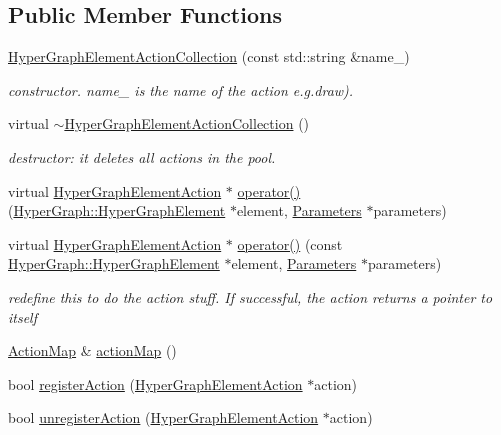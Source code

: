 \subsection*{Public Member Functions}
\begin{DoxyCompactItemize}
\item 
\hyperlink{classg2o_1_1HyperGraphElementActionCollection_a6af1ca2dfcdc0894eb594c68135dd614}{Hyper\+Graph\+Element\+Action\+Collection} (const std\+::string \&name\+\_\+)
\begin{DoxyCompactList}\small\item\em constructor. name\+\_\+ is the name of the action e.\+g.\+draw). \end{DoxyCompactList}\item 
virtual \hyperlink{classg2o_1_1HyperGraphElementActionCollection_ad55fc899922f91c1446d9d69f343c7ab}{$\sim$\+Hyper\+Graph\+Element\+Action\+Collection} ()
\begin{DoxyCompactList}\small\item\em destructor\+: it deletes all actions in the pool. \end{DoxyCompactList}\item 
virtual \hyperlink{classg2o_1_1HyperGraphElementAction}{Hyper\+Graph\+Element\+Action} $\ast$ \hyperlink{classg2o_1_1HyperGraphElementActionCollection_a1388f0d6629501c1b80035f80c56efbe}{operator()} (\hyperlink{structg2o_1_1HyperGraph_1_1HyperGraphElement}{Hyper\+Graph\+::\+Hyper\+Graph\+Element} $\ast$element, \hyperlink{structg2o_1_1HyperGraphElementAction_1_1Parameters}{Parameters} $\ast$parameters)
\item 
virtual \hyperlink{classg2o_1_1HyperGraphElementAction}{Hyper\+Graph\+Element\+Action} $\ast$ \hyperlink{classg2o_1_1HyperGraphElementActionCollection_a4cb9b20a8b1aac8eb018ef6fc4ec0dfc}{operator()} (const \hyperlink{structg2o_1_1HyperGraph_1_1HyperGraphElement}{Hyper\+Graph\+::\+Hyper\+Graph\+Element} $\ast$element, \hyperlink{structg2o_1_1HyperGraphElementAction_1_1Parameters}{Parameters} $\ast$parameters)
\begin{DoxyCompactList}\small\item\em redefine this to do the action stuff. If successful, the action returns a pointer to itself \end{DoxyCompactList}\item 
\hyperlink{classg2o_1_1HyperGraphElementAction_abc889fc90ae1bbb63d90c7993777417a}{Action\+Map} \& \hyperlink{classg2o_1_1HyperGraphElementActionCollection_a26d57ddd0079ed7181fbb322c9a8106c}{action\+Map} ()
\item 
bool \hyperlink{classg2o_1_1HyperGraphElementActionCollection_a9eb641e9c9bb22f3540dc98c2c750ea9}{register\+Action} (\hyperlink{classg2o_1_1HyperGraphElementAction}{Hyper\+Graph\+Element\+Action} $\ast$action)
\item 
bool \hyperlink{classg2o_1_1HyperGraphElementActionCollection_a6dc646c0dd8fbf9b54fb8161348af5e6}{unregister\+Action} (\hyperlink{classg2o_1_1HyperGraphElementAction}{Hyper\+Graph\+Element\+Action} $\ast$action)
\end{DoxyCompactItemize}
